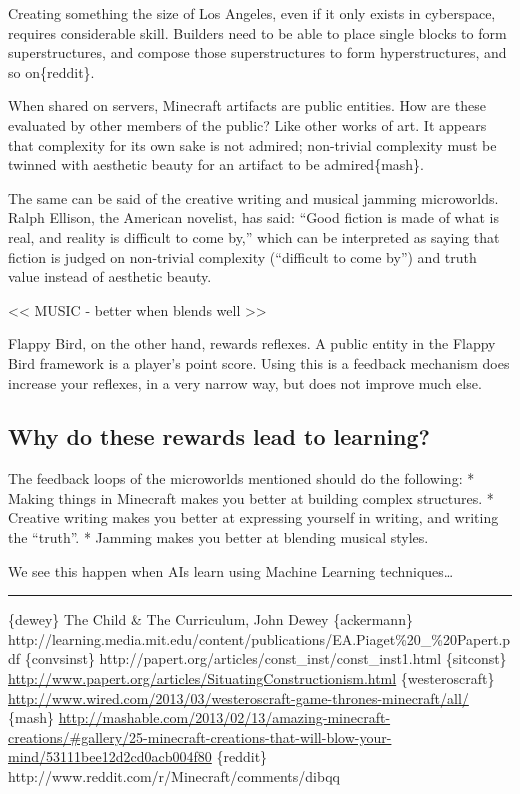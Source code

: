 Creating something the size of Los Angeles, even if it only exists in
cyberspace, requires considerable skill. Builders need to be able to
place single blocks to form superstructures, and compose those
superstructures to form hyperstructures, and so on\{reddit\}.

When shared on servers, Minecraft artifacts are public entities. How are
these evaluated by other members of the public? Like other works of art.
It appears that complexity for its own sake is not admired; non-trivial
complexity must be twinned with aesthetic beauty for an artifact to be
admired\{mash\}.

The same can be said of the creative writing and musical jamming
microworlds. Ralph Ellison, the American novelist, has said: ``Good
fiction is made of what is real, and reality is difficult to come by,''
which can be interpreted as saying that fiction is judged on non-trivial
complexity (``difficult to come by'') and truth value instead of
aesthetic beauty.

\textless{}\textless{} MUSIC - better when blends well
\textgreater{}\textgreater{}

Flappy Bird, on the other hand, rewards reflexes. A public entity in the
Flappy Bird framework is a player's point score. Using this is a
feedback mechanism does increase your reflexes, in a very narrow way,
but does not improve much else.

\subsection{Why do these rewards lead to learning?}

The feedback loops of the microworlds mentioned should do the following:
* Making things in Minecraft makes you better at building complex
structures. * Creative writing makes you better at expressing yourself
in writing, and writing the ``truth''. * Jamming makes you better at
blending musical styles.

We see this happen when AIs learn using Machine Learning
techniques\ldots{}

\begin{center}\rule{3in}{0.4pt}\end{center}

\{dewey\} The Child \& The Curriculum, John Dewey \{ackermann\}
http://learning.media.mit.edu/content/publications/EA.Piaget\%20\_\%20Papert.pdf
\{convsinst\} http://papert.org/articles/const\_inst/const\_inst1.html
\{sitconst\}
\href{}{http://www.papert.org/articles/SituatingConstructionism.html}
\{westeroscraft\}
\href{http://www.wired.com/2013/03/westeroscraft-game-thrones-minecraft/all/}{http://www.wired.com/2013/03/westeroscraft-game-thrones-minecraft/all/}
\{mash\}
\href{http://mashable.com/2013/02/13/amazing-minecraft-creations/\#gallery/25-minecraft-creations-that-will-blow-your-mind/53111bee12d2cd0acb004f80}{http://mashable.com/2013/02/13/amazing-minecraft-creations/\#gallery/25-minecraft-creations-that-will-blow-your-mind/53111bee12d2cd0acb004f80}
\{reddit\} http://www.reddit.com/r/Minecraft/comments/dibqq
